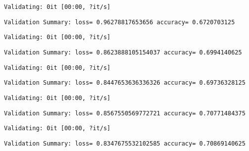 \documentclass[11pt]{article}
\begin{document}
    
    \begin{Verbatim}[commandchars=\\\{\}]
Validating: 0it [00:00, ?it/s]
    \end{Verbatim}

    
    \begin{Verbatim}[commandchars=\\\{\}]
Validation Summary: loss= 0.96278817653656 accuracy= 0.6720703125
    \end{Verbatim}

    
    \begin{Verbatim}[commandchars=\\\{\}]
Validating: 0it [00:00, ?it/s]
    \end{Verbatim}

    
    \begin{Verbatim}[commandchars=\\\{\}]
Validation Summary: loss= 0.8623888105154037 accuracy= 0.6994140625
    \end{Verbatim}

    
    \begin{Verbatim}[commandchars=\\\{\}]
Validating: 0it [00:00, ?it/s]
    \end{Verbatim}

    
    \begin{Verbatim}[commandchars=\\\{\}]
Validation Summary: loss= 0.8447653636336326 accuracy= 0.69736328125
    \end{Verbatim}

    
    \begin{Verbatim}[commandchars=\\\{\}]
Validating: 0it [00:00, ?it/s]
    \end{Verbatim}

    
    \begin{Verbatim}[commandchars=\\\{\}]
Validation Summary: loss= 0.8567550569772721 accuracy= 0.70771484375
    \end{Verbatim}

    
    \begin{Verbatim}[commandchars=\\\{\}]
Validating: 0it [00:00, ?it/s]
    \end{Verbatim}

    
    \begin{Verbatim}[commandchars=\\\{\}]
Validation Summary: loss= 0.8347675532102585 accuracy= 0.70869140625
    \end{Verbatim}
\end{document}
